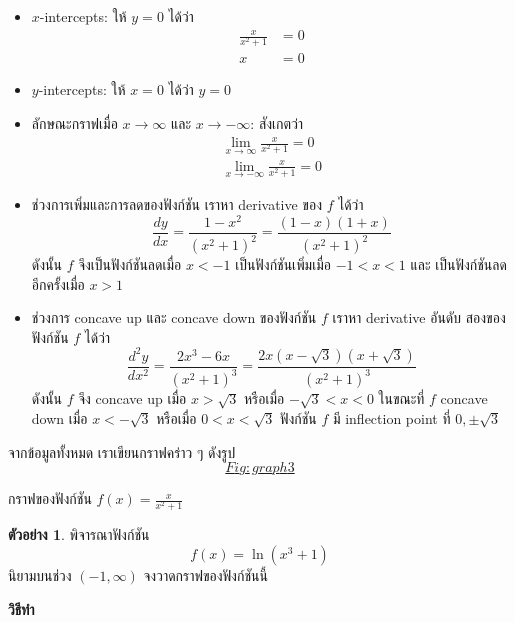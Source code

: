 \documentclass[
]{book}
\theoremstyle{definition}
\theoremstyle{definition}
\newtheorem{example}{ตัวอย่าง}[chapter]
\theoremstyle{definition}
\theoremstyle{definition}
\theoremstyle{remark}
\begin{document}
\begin{itemize}
\item
  \(x\)-intercepts: ให้ \(y=0\) ได้ว่า \begin{equation}   \begin{aligned}
      \frac{x}{x^2+1} &= 0 \\
      x &= 0
    \end{aligned} \end{equation}
\item
  \(y\)-intercepts: ให้ \(x=0\) ได้ว่า \(y=0\)
\item
  ลักษณะกราฟเมื่อ \(x \to \infty\) และ \(x \to -\infty\): สังเกตว่า
  \begin{equation}   \begin{aligned}
      \lim_{x\to \infty} \frac{x}{x^2+1} = 0 \\
      \lim_{x\to -\infty} \frac{x}{x^2+1} = 0
    \end{aligned} \end{equation}
\item
  ช่วงการเพิ่มและการลดของฟังก์ชัน เราหา derivative ของ \(f\) ได้ว่า
  \[\frac{dy}{dx} = \frac{1-x^2}{(x^2+1)^2}  =\frac{(1-x)(1+x)}{(x^2+1)^2}\]
  ดังนั้น \(f\) จึงเป็นฟังก์ชันลดเมื่อ \(x < -1\) เป็นฟังก์ชันเพิ่มเมื่อ \(-1 < x < 1\) และ
  เป็นฟังก์ชันลดอีกครั้งเมื่อ \(x>1\)
\item
  ช่วงการ concave up และ concave down ของฟังก์ชัน \(f\) เราหา derivative
  อันดับ สองของฟังก์ชัน \(f\) ได้ว่า
  \[\frac{d^2y}{dx^2} = \frac{2x^3-6x}{(x^2+1)^3} = \frac{2x(x-\sqrt{3})(x+\sqrt{3})}{(x^2+1)^3}\]
  ดังนั้น \(f\) จึง concave up เมื่อ \(x>\sqrt{3}\) หรือเมื่อ \(-\sqrt{3}<x<0\)
  ในขณะที่ \(f\) concave down เมื่อ \(x<-\sqrt{3}\) หรือเมื่อ \(0<x<\sqrt{3}\)
  ฟังก์ชัน \(f\) มี inflection point ที่ \(0,\pm\sqrt{3}\)
\end{itemize}

จากข้อมูลทั้งหมด เราเขียนกราฟคร่าว ๆ
ดังรูป~\hyperref[Fig:graph3]{\[Fig:graph3\]}

กราฟของฟังก์ชัน {\(f(x) =
\frac{x}{x^2+1}\)}

\begin{example}
พิจารณาฟังก์ชัน \[f(x) = \ln(x^3+1)\] นิยามบนช่วง \((-1,\infty)\)
จงวาดกราฟของฟังก์ชันนี้
\end{example}

\textbf{วิธีทำ}
\end{document}
